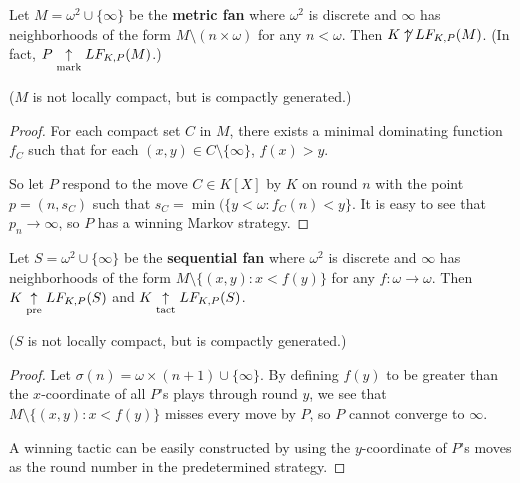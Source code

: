 \begin{example}
Let $M = \omega^2 \cup \{\infty\}$ be the \textbf{metric fan} where $\omega^2$ is discrete and $\infty$ has neighborhoods of the form $M \setminus (n\times\omega)$ for any $n<\omega$. Then $K \not\uparrow LF_{K,P}(M)$. (In fact, $P \underset{\text{mark}}{\uparrow} LF_{K,P}(M)$.)

($M$ is not locally compact, but is compactly generated.)
\end{example}

\begin{proof}
For each compact set $C$ in $M$, there exists a minimal dominating function $f_C$ such that for each $(x,y)\in C\setminus\{\infty\}$, $f(x)> y$.

So let $P$ respond to the move $C\in K[X]$ by $K$ on round $n$ with the point $p=(n,s_C)$ such that $s_C = \min(\{y<\omega : f_C(n) < y\}$. It is easy to see that $p_n\rightarrow \infty$, so $P$ has a winning Markov strategy.
\end{proof}

\begin{example}
Let $S = \omega^2 \cup \{\infty\}$ be the \textbf{sequential fan} where $\omega^2$ is discrete and $\infty$ has neighborhoods of the form $M \setminus \{(x,y) : x<f(y)\}$ for any $f:\omega\to\omega$. Then $K \underset{\text{pre}}{\uparrow} LF_{K,P}(S)$ and $K\underset{\text{tact}}{\uparrow} LF_{K,P}(S)$.

($S$ is not locally compact, but is compactly generated.)


\end{example}

\begin{proof}
Let $\sigma(n)=\omega\times(n+1) \cup \{\infty\}$. By defining $f(y)$ to be greater than the $x$-coordinate of all $P$'s plays through round $y$, we see that $M\setminus\{(x,y): x<f(y)\}$ misses every move by $P$, so $P$ cannot converge to $\infty$.

A winning tactic can be easily constructed by using the $y$-coordinate of $P$'s moves as the round number in the predetermined strategy.
\end{proof}
